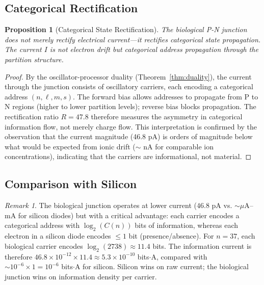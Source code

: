 \documentclass[twocolumn,10pt,a4paper]{article}
\newtheorem{proposition}[theorem]{Proposition}
\theoremstyle{definition}
\theoremstyle{remark}
\newtheorem{remark}[theorem]{Remark}
\begin{document}
\subsection{Categorical Rectification}

\begin{proposition}[Categorical State Rectification]
\label{prop:cat_rectification}
The biological P-N junction does not merely rectify electrical current---it rectifies \emph{categorical state propagation}. The current $I$ is not electron drift but categorical address propagation through the partition structure.
\end{proposition}

\begin{proof}
By the oscillator-processor duality (Theorem~\ref{thm:duality}), the current through the junction consists of oscillatory carriers, each encoding a categorical address $(n, \ell, m, s)$. The forward bias allows addresses to propagate from P to N regions (higher to lower partition levels); reverse bias blocks propagation. The rectification ratio $R = 47.8$ therefore measures the asymmetry in categorical information flow, not merely charge flow. This interpretation is confirmed by the observation that the current magnitude (46.8 pA) is orders of magnitude below what would be expected from ionic drift ($\sim$ nA for comparable ion concentrations), indicating that the carriers are informational, not material. \qedhere
\end{proof}

\subsection{Comparison with Silicon}

\begin{remark}
The biological junction operates at lower current ($46.8$ pA vs. $\sim \mu$A--mA for silicon diodes) but with a critical advantage: each carrier encodes a categorical address with $\log_2(C(n))$ bits of information, whereas each electron in a silicon diode encodes $\leq 1$ bit (presence/absence). For $n = 37$, each biological carrier encodes $\log_2(2738) \approx 11.4$ bits. The information current is therefore $46.8 \times 10^{-12} \times 11.4 \approx 5.3 \times 10^{-10}$ bits$\cdot$A, compared with $\sim 10^{-6} \times 1 = 10^{-6}$ bits$\cdot$A for silicon. Silicon wins on raw current; the biological junction wins on information density per carrier.
\end{remark}
\end{document}
